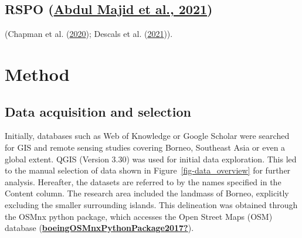 \documentclass[
  letterpaper,
  DIV=11,
  numbers=noendperiod]{scrreprt}
\begin{document}
\hypertarget{rspo-abdulmajidsustainablepalmoil2021}{%
\section{\texorpdfstring{RSPO
(\protect\hyperlink{ref-abdulmajidSustainablePalmOil2021}{Abdul Majid et
al.,
2021})}{RSPO (Abdul Majid et al., 2021)}}\label{rspo-abdulmajidsustainablepalmoil2021}}

(Chapman et al.
(\protect\hyperlink{ref-chapmanCompoundingImpactDeforestation2020}{2020});
Descals et al.
(\protect\hyperlink{ref-descalsHighresolutionGlobalMap2021}{2021})).


\hypertarget{sec-method}{%
\chapter{Method}\label{sec-method}}

\hypertarget{data-acquisition-and-selection}{%
\section{Data acquisition and
selection}\label{data-acquisition-and-selection}}

Initially, databases such as Web of Knowledge or Google Scholar were
searched for GIS and remote sensing studies covering Borneo, Southeast
Asia or even a global extent. QGIS (Version 3.30) was used for initial
data exploration. This led to the manual selection of data shown in
Figure~\ref{fig-data_overview} for further analysis. Hereafter, the
datasets are referred to by the names specified in the Content column.
The research area included the landmass of Borneo, explicitly excluding
the smaller surrounding islands. This delineation was obtained through
the OSMnx python package, which accesses the Open Street Maps (OSM)
database
(\protect\hyperlink{ref-boeingOSMnxPythonPackage2017}{\textbf{boeingOSMnxPythonPackage2017?}}).
\end{document}
